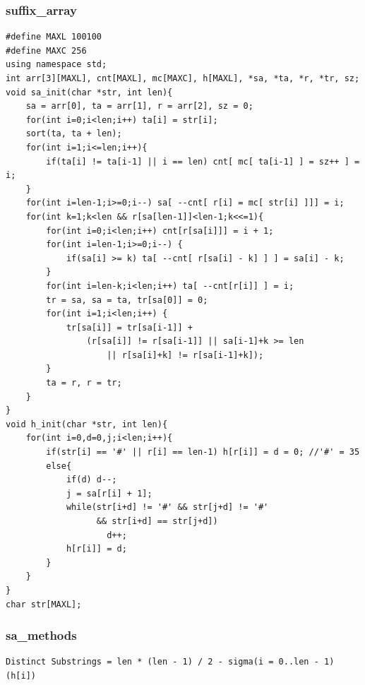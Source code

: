 \documentclass[a4paper]{article}
\begin{document}
\begin{CJK*}{UTF8}{gbsn}
\begin{multicols}{3}
\begin{flushleft}
\subsubsection{suffix\_array}
\begin{lstlisting}
#define MAXL 100100
#define MAXC 256
using namespace std;
int arr[3][MAXL], cnt[MAXL], mc[MAXC], h[MAXL], *sa, *ta, *r, *tr, sz;
void sa_init(char *str, int len){
    sa = arr[0], ta = arr[1], r = arr[2], sz = 0;
    for(int i=0;i<len;i++) ta[i] = str[i];
    sort(ta, ta + len);
    for(int i=1;i<=len;i++){
        if(ta[i] != ta[i-1] || i == len) cnt[ mc[ ta[i-1] ] = sz++ ] = i;
    }
    for(int i=len-1;i>=0;i--) sa[ --cnt[ r[i] = mc[ str[i] ]]] = i;
    for(int k=1;k<len && r[sa[len-1]]<len-1;k<<=1){
        for(int i=0;i<len;i++) cnt[r[sa[i]]] = i + 1;
        for(int i=len-1;i>=0;i--) {
            if(sa[i] >= k) ta[ --cnt[ r[sa[i] - k] ] ] = sa[i] - k;
        }
        for(int i=len-k;i<len;i++) ta[ --cnt[r[i]] ] = i;
        tr = sa, sa = ta, tr[sa[0]] = 0;
        for(int i=1;i<len;i++) {
            tr[sa[i]] = tr[sa[i-1]] +
                (r[sa[i]] != r[sa[i-1]] || sa[i-1]+k >= len
                    || r[sa[i]+k] != r[sa[i-1]+k]);
        }
        ta = r, r = tr;
    }
}
void h_init(char *str, int len){
    for(int i=0,d=0,j;i<len;i++){
        if(str[i] == '#' || r[i] == len-1) h[r[i]] = d = 0; //'#' = 35
        else{
            if(d) d--;
            j = sa[r[i] + 1];
            while(str[i+d] != '#' && str[j+d] != '#'
                  && str[i+d] == str[j+d])
                    d++;
            h[r[i]] = d;
        }
    }
}
char str[MAXL];
\end{lstlisting}

\subsubsection{sa\_methods}
\begin{lstlisting}
Distinct Substrings = len * (len - 1) / 2 - sigma(i = 0..len - 1)(h[i])
\end{lstlisting}

\end{flushleft}
\end{multicols}
\end{CJK*}
\end{document}
